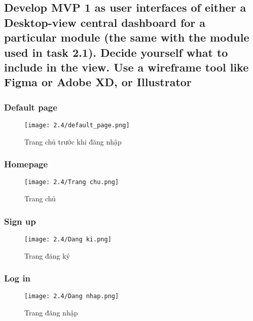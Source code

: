 \subsection{Develop MVP 1 as user interfaces of either a Desktop-view central 
dashboard for a particular module (the same with the module used in task 
2.1). Decide yourself what to include in the view. Use a wireframe tool like 
Figma or Adobe XD, or Illustrator}
\subsubsection{Default page}
\begin{figure}[H]
    \centering
    \texttt{[image: 2.4/default\_page.png]}
    \newline
    \newline
    \caption{Trang chủ trước khi đăng nhập}
    \label{fig:enter-label}
\end{figure}

\subsubsection{Homepage}
\begin{figure}[H]
    \centering
    \texttt{[image: 2.4/Trang chu.png]}
    \newline
    \newline
    \caption{Trang chủ}
    \label{fig:enter-label}
\end{figure}

\subsubsection{Sign up}
\begin{figure}[H]
    \centering
    \texttt{[image: 2.4/Dang ki.png]}
    \newline
    \newline
    \caption{Trang đăng ký}
    \label{fig:enter-label}
\end{figure}

\subsubsection{Log in}
\begin{figure}[H]
    \centering
    \texttt{[image: 2.4/Dang nhap.png]}
    \newline
    \newline
    \caption{Trang đăng nhập}
    \label{fig:enter-label}
\end{figure}


